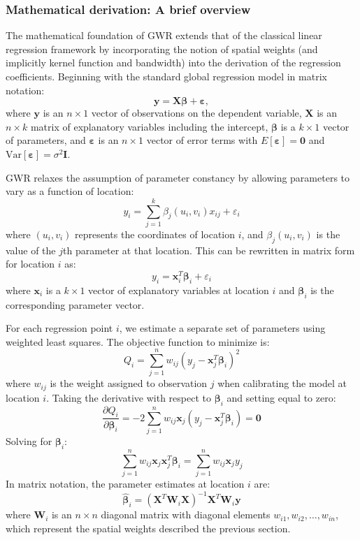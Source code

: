 \documentclass[smallextended, natbib]{svjour3}       %
\begin{document}
\subsubsection*{Mathematical derivation: A brief overview}

The mathematical foundation of GWR extends that of the classical linear regression framework by incorporating the notion of spatial weights (and implicitly kernel function and bandwidth) into the derivation of the regression coefficients. 
Beginning with the standard global regression model in matrix notation:
$$\mathbf{y} = \mathbf{X}\boldsymbol{\beta} + \boldsymbol{\varepsilon},$$
where $\mathbf{y}$ is an $n \times 1$ vector of observations on the dependent variable, $\mathbf{X}$ is an $n \times k$ matrix of explanatory variables including the intercept, $\boldsymbol{\beta}$ is a $k \times 1$ vector of parameters, and $\boldsymbol{\varepsilon}$ is an $n \times 1$ vector of error terms with $E[\boldsymbol{\varepsilon}] = \mathbf{0}$ and $\text{Var}[\boldsymbol{\varepsilon}] = \sigma^2\mathbf{I}$.

GWR relaxes the assumption of parameter constancy by allowing parameters to vary as a function of location:
$$y_i = \sum_{j=1}^{k} \beta_j(u_i, v_i)x_{ij} + \varepsilon_i$$
where $(u_i, v_i)$ represents the coordinates of location $i$, and $\beta_j(u_i, v_i)$ is the value of the $j$th parameter at that location. 
This can be rewritten in matrix form for location $i$ as:
$$y_i = \mathbf{x}_i^T\boldsymbol{\beta}_i + \varepsilon_i$$
where $\mathbf{x}_i$ is a $k \times 1$ vector of explanatory variables at location $i$ and $\boldsymbol{\beta}_i$ is the corresponding parameter vector.

For each regression point $i$, we estimate a separate set of parameters using weighted least squares.
The objective function to minimize is:
$$Q_i = \sum_{j=1}^{n} w_{ij}(y_j - \mathbf{x}_j^T\boldsymbol{\beta}_i)^2$$
where $w_{ij}$ is the weight assigned to observation $j$ when calibrating the model at location $i$. Taking the derivative with respect to $\boldsymbol{\beta}_i$ and setting equal to zero:
$$\frac{\partial Q_i}{\partial \boldsymbol{\beta}_i} = -2\sum_{j=1}^{n} w_{ij}\mathbf{x}_j(y_j - \mathbf{x}_j^T\boldsymbol{\beta}_i) = \mathbf{0}$$
Solving for $\boldsymbol{\beta}_i$:
$$\sum_{j=1}^{n} w_{ij}\mathbf{x}_j\mathbf{x}_j^T\boldsymbol{\beta}_i = \sum_{j=1}^{n} w_{ij}\mathbf{x}_jy_j$$
In matrix notation, the parameter estimates at location $i$ are:
$$\hat{\boldsymbol{\beta}}_i = (\mathbf{X}^T\mathbf{W}_i\mathbf{X})^{-1}\mathbf{X}^T\mathbf{W}_i\mathbf{y}$$
where $\mathbf{W}_i$ is an $n \times n$ diagonal matrix with diagonal elements $w_{i1}, w_{i2}, \dots, w_{in}$, which represent the spatial weights described the previous section. 
\end{document}
